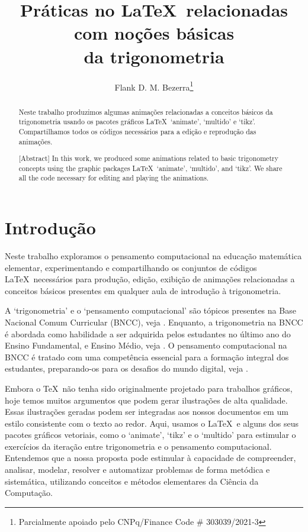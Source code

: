 \documentclass[10pt]{article}
\title{Práticas no \LaTeX\  relacionadas com noções básicas\\
 da trigonometria}
\author[Bezerra]{Flank D. M. Bezerra\thanks{Parcialmente apoiado pelo CNPq/Finance Code \# 303039/2021-3}}
\theoremstyle{plain} %
\theoremstyle{definition} %
\theoremstyle{remark} %
\begin{document}

\maketitle

\begin{abstract}
Neste trabalho produzimos algumas animações relacionadas a conceitos básicos da trigonometria usando os pacotes gráficos \LaTeX\, ‘animate', ‘multido' e ‘tikz'. Compartilhamos todos os códigos necessários para a edição e reprodução das animações.
\end{abstract}


\begin{abstract}[Abstract]
In this work, we produced some animations related to basic trigonometry concepts using the graphic packages \LaTeX\, ‘animate', ‘multido', and ‘tikz'. We share all the code necessary for editing and playing the animations.
\end{abstract}

 
 \section{Introdu\c c\~ao}
 
 

Neste trabalho exploramos o pensamento computacional na educação matemática elementar, experimentando e compartilhando os conjuntos de códigos \LaTeX\ necessários para produção, edição, exibição de animações relacionadas a conceitos básicos presentes em qualquer aula de introdução à trigonometria. 

A ‘trigonometria' e o ‘pensamento computacional' são tópicos presentes na Base Nacional Comum Curricular (BNCC), veja \cite{BNCC}. Enquanto, a trigonometria na BNCC é abordada como habilidade a ser adquirida pelos estudantes no último ano do Ensino Fundamental, e Ensino Médio, veja  \cite[Habilidade EF09MA13 e Habilidade EM13MAT306]{BNCC}. O pensamento computacional na BNCC é tratado com uma competência essencial para a formação integral dos estudantes, preparando-os para os desafios do mundo digital, veja \cite[EI03CO01]{BNCC}.


Embora o \TeX\ não tenha sido originalmente projetado para trabalhos gráficos, hoje temos muitos argumentos que podem gerar ilustrações de alta qualidade. Essas ilustrações geradas podem ser integradas aos nossos documentos em um estilo consistente com o texto ao redor. Aqui, usamos o \LaTeX\ e alguns dos seus pacotes gráficos vetoriais, como o ‘animate', ‘tikz' e o ‘multido' para estimular o exercícios da iteração entre trigonometria e o pensamento computacional. Entendemos que a nossa proposta pode estimular à capacidade de compreender, analisar, modelar, resolver e automatizar problemas de forma metódica e sistemática, utilizando conceitos e métodos elementares da Ciência da Computação. 
\end{document}
